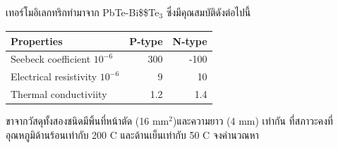 \documentclass[a4paper,nobib,openany,10pt]{tufte-book}
\begin{document}
เทอร์โมอิเลกทริกทำมาจาก PbTe-Bi\$\textsubscript{}\$Te\(_{\text{3}}\)
ซึ่งมีคุณสมบัติดังต่อไปนี้

\begin{table}[htbp]
\label{tab:org87003db}
\centering
\begin{tabular}{lrr}
\toprule
Properties & P-type & N-type\\
\midrule
Seebeck coefficient \(10^{-6}\) & 300 & -100\\
Electrical resistivity \(10^{-6}\) & 9 & 10\\
Thermal conductiviity & 1.2 & 1.4\\
\bottomrule
\end{tabular}
\end{table}

ขาจากวัสดุทั้งสองชนิดมีพิ้นที่หน้าตัด (16 mm\(^2\))และความยาว (4 mm)
เท่ากัน ที่สภาวะคงที่อุณหภูมิด้านร้อนเท่ากับ 200 C และด้านเย็นเท่ากับ 50
C จงคำนวณหา
\end{document}
